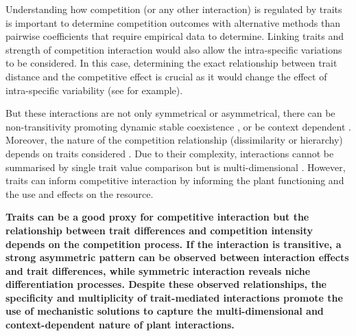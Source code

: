 Understanding how competition (or any other interaction) is regulated by traits is important to determine competition outcomes with alternative methods than pairwise coefficients that require empirical data to determine. Linking traits and strength of competition interaction would also allow the intra-specific variations to be considered. In this case, determining the exact relationship between trait distance and the competitive effect is crucial as it would change the effect of intra-specific variability (see \cite{hart_how_2016} for example).

But these interactions are not only symmetrical or asymmetrical, there can be non-transitivity promoting dynamic stable coexistence \parencite{levine_beyond_2017}, or be context dependent \parencite{callaway_positive_2002}. Moreover, the nature of the competition relationship (dissimilarity or hierarchy) depends on traits considered \parencite{bennett_reciprocal_2016}. Due to their complexity, interactions cannot be summarised by single trait value comparison but is multi-dimensional \parencite{kraft_plant_2015}. However, traits can inform competitive interaction by informing the plant functioning and the use and effects on the resource.











\textbf{Traits can be a good proxy for competitive interaction but the relationship between trait differences and competition intensity depends on the competition process. If the interaction is transitive, a strong asymmetric pattern can be observed between interaction effects and trait differences, while symmetric interaction reveals niche differentiation processes. Despite these observed relationships, the specificity and multiplicity of trait-mediated interactions promote the use of mechanistic solutions to capture the multi-dimensional and context-dependent nature of plant interactions.}


